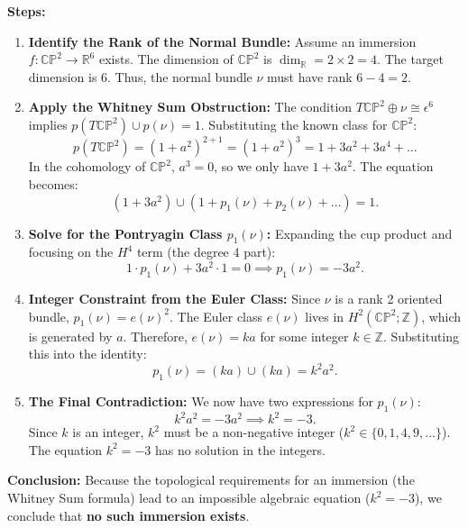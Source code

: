 \begin{solution}
\textbf{Steps:}
\begin{enumerate}
    \item \textbf{Identify the Rank of the Normal Bundle:} 
    Assume an immersion $f : \mathbb{CP}^2 \to \mathbb{R}^6$ exists. 
    The dimension of $\mathbb{CP}^2$ is $\dim_{\mathbb{R}} = 2 \times 2 = 4$.
    The target dimension is 6. Thus, the normal bundle $\nu$ must have rank $6 - 4 = 2$.
    
    \item \textbf{Apply the Whitney Sum Obstruction:} 
    The condition $T\mathbb{CP}^2 \oplus \nu \cong \epsilon^6$ implies $p(T\mathbb{CP}^2) \cup p(\nu) = 1$.
    Substituting the known class for $\mathbb{CP}^2$:
    \[ p(T\mathbb{CP}^2) = (1 + a^2)^{2+1} = (1 + a^2)^3 = 1 + 3a^2 + 3a^4 + \dots \]
    In the cohomology of $\mathbb{CP}^2$, $a^3 = 0$, so we only have $1 + 3a^2$.
    The equation becomes:
    \[ (1 + 3a^2) \cup (1 + p_1(\nu) + p_2(\nu) + \dots) = 1. \]
    
    \item \textbf{Solve for the Pontryagin Class $p_1(\nu)$:} 
    Expanding the cup product and focusing on the $H^4$ term (the degree 4 part):
    \[ 1 \cdot p_1(\nu) + 3a^2 \cdot 1 = 0 \implies p_1(\nu) = -3a^2. \]

    \item \textbf{Integer Constraint from the Euler Class:} 
    Since $\nu$ is a rank 2 oriented bundle, $p_1(\nu) = e(\nu)^2$.
    The Euler class $e(\nu)$ lives in $H^2(\mathbb{CP}^2; \mathbb{Z})$, which is generated by $a$.
    Therefore, $e(\nu) = k a$ for some integer $k \in \mathbb{Z}$.
    Substituting this into the identity:
    \[ p_1(\nu) = (k a) \cup (k a) = k^2 a^2. \]
    
    \item \textbf{The Final Contradiction:} 
    We now have two expressions for $p_1(\nu)$:
    \[ k^2 a^2 = -3a^2 \implies k^2 = -3. \]
    Since $k$ is an integer, $k^2$ must be a non-negative integer ($k^2 \in \{0, 1, 4, 9, \dots\}$).
    The equation $k^2 = -3$ has no solution in the integers.
\end{enumerate}

\textbf{Conclusion:} 
Because the topological requirements for an immersion (the Whitney Sum formula) lead to an impossible algebraic equation ($k^2 = -3$), we conclude that \textbf{no such immersion exists}.


\end{solution}
